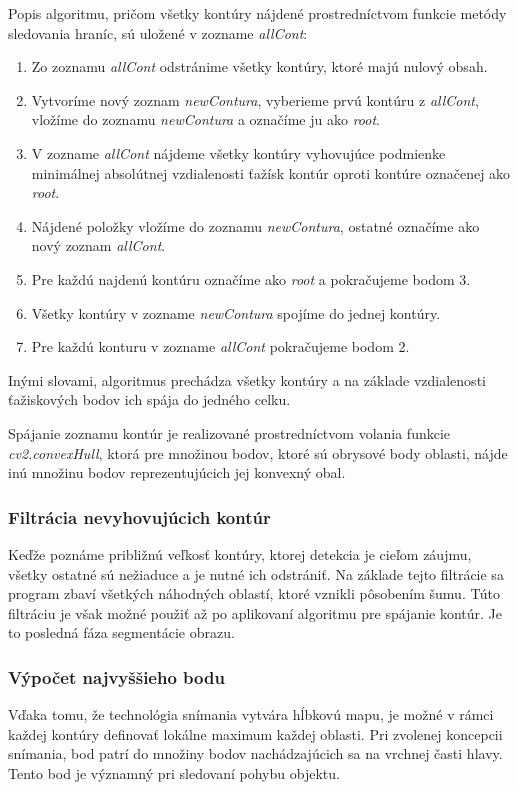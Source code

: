Popis algoritmu, pričom všetky kontúry nájdené prostredníctvom funkcie metódy sledovania hraníc, sú uložené v zozname \textit{allCont}:
\begin{enumerate}
  \item Zo zoznamu \textit{allCont} odstránime všetky kontúry, ktoré majú nulový obsah.
  \item Vytvoríme nový zoznam \textit{newContura}, vyberieme prvú kontúru z \textit{allCont}, vložíme do zoznamu \textit{newContura} a označíme ju ako \textit{root}.
  \item V zozname \textit{allCont} nájdeme všetky kontúry vyhovujúce podmienke minimálnej absolútnej vzdialenosti ťažísk kontúr oproti kontúre označenej ako \textit{root}.
  \item Nájdené položky vložíme do zoznamu \textit{newContura}, ostatné označíme ako nový zoznam
  \textit{allCont}.
  \item Pre každú najdenú kontúru označíme ako \textit{root} a  pokračujeme bodom 3.
  \item Všetky kontúry v zozname \textit{newContura} spojíme do jednej kontúry.
  \item Pre každú konturu v zozname \textit{allCont} pokračujeme bodom 2.
  
\end{enumerate}
Inými slovami, algoritmus prechádza všetky kontúry a na základe vzdialenosti ťažiskových bodov ich spája do jedného celku.


Spájanie zoznamu kontúr je realizované prostredníctvom volania funkcie \textit{cv2.convexHull}, ktorá pre množinou bodov, ktoré sú obrysové body oblasti, nájde inú množinu bodov reprezentujúcich jej konvexný obal.

\subsubsection{Filtrácia nevyhovujúcich kontúr}  
Keďže poznáme približnú veľkosť kontúry, ktorej detekcia je cieľom záujmu, všetky ostatné sú nežiaduce a je nutné ich odstrániť. Na základe tejto filtrácie sa program zbaví všetkých náhodných oblastí, ktoré vznikli pôsobením šumu. Túto filtráciu je však možné použiť až po aplikovaní algoritmu pre spájanie kontúr. Je to posledná fáza segmentácie obrazu. 

\subsubsection{Výpočet najvyššieho bodu}
Vďaka tomu, že technológia snímania vytvára hĺbkovú mapu, je možné v rámci každej kontúry definovať lokálne maximum každej oblasti. Pri zvolenej koncepcii snímania, bod patrí do množiny bodov nachádzajúcich sa na vrchnej časti hlavy. Tento bod je významný pri sledovaní pohybu objektu. \vspace{5mm}


